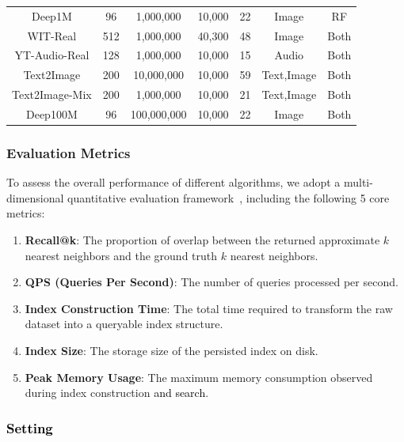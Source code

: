 \documentclass[sigconf, nonacm, pdfa]{acmart}
\begin{document}
{\begin{table}[t]
{\begin{tabular}{ccccccc}
				Deep1M & 96 & 1,000,000 & 10,000 & 22 & Image& RF \\
				WIT-Real & 512 & 1,000,000 & 40,300 & 48& Image& Both \\
				YT-Audio-Real& 128 & 1,000,000 & 10,000 & 15& Audio& Both \\
				Text2Image & 200 & 10,000,000 &10,000 & 59& Text,Image& Both \\
				Text2Image-Mix & 200 & 1,000,000 &10,000 & 21& Text,Image& Both \\
				Deep100M & 96 & 100,000,000 & 10,000 & 22& Image& Both \\
				\bottomrule
			\end{tabular}
		}
	\end{table}
	
	
	
	
	
	
	\subsubsection{Evaluation Metrics}
	
	To assess the overall performance of different algorithms, we adopt a multi-dimensional quantitative evaluation framework~\cite{compare}, including the following 5 core metrics:
	
	\begin{enumerate}
		
		\item \textbf{Recall@k}: The proportion of overlap between the returned approximate $k$ nearest neighbors and the ground truth $k$ nearest neighbors.
		\item \textbf{QPS (Queries Per Second)}: The number of queries processed per second.
		\item \textbf{Index Construction Time}: The total time required to transform the raw dataset into a queryable index structure.
		\item \textbf{Index Size}: The storage size of the persisted index on disk.
		\item \textbf{Peak Memory Usage}: The maximum memory consumption observed during index construction \textcolor{black}{and search}.
	\end{enumerate}
	

	
	
	
	\subsubsection{\textcolor{black}{Setting}}
	
}
\end{document}
